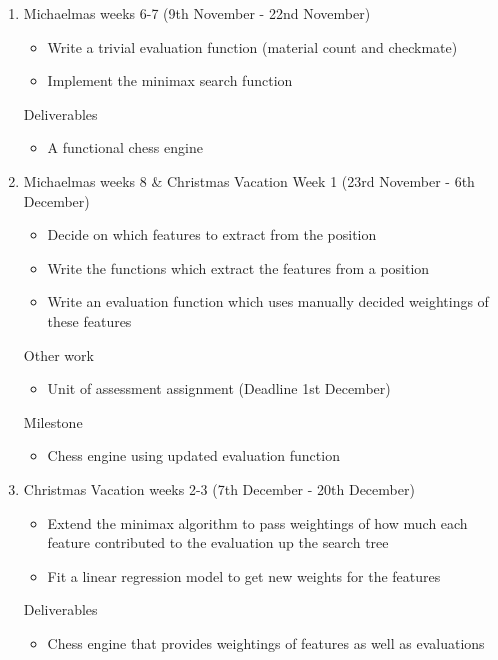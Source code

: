 \documentclass[12pt,a4paper]{article}
\begin{document}
\begin{enumerate}
    \item Michaelmas weeks 6-7 (9th November - 22nd November)
    \begin{itemize}
        \item Write a trivial evaluation function (material count and checkmate)
        \item Implement the minimax search function
    \end{itemize}
    Deliverables
    \begin{itemize}
        \item A functional chess engine
    \end{itemize}

    \item Michaelmas weeks 8 \& Christmas Vacation Week 1 (23rd November - 6th December)
    \begin{itemize}
        \item Decide on which features to extract from the position
        \item Write the functions which extract the features from a position
        \item Write an evaluation function which uses manually decided weightings of these features
    \end{itemize}
    Other work
    \begin{itemize}
        \item Unit of assessment assignment (Deadline 1st December)
    \end{itemize}
    Milestone
    \begin{itemize}
        \item Chess engine using updated evaluation function
    \end{itemize}

    \item Christmas Vacation weeks 2-3 (7th December - 20th December)
    \begin{itemize}
        \item Extend the minimax algorithm to pass weightings of how much each feature contributed to the evaluation up the search tree
        \item Fit a linear regression model to get new weights for the features
    \end{itemize}
    Deliverables
    \begin{itemize}
        \item Chess engine that provides weightings of features as well as evaluations
    \end{itemize}


\end{enumerate}
\end{document}

